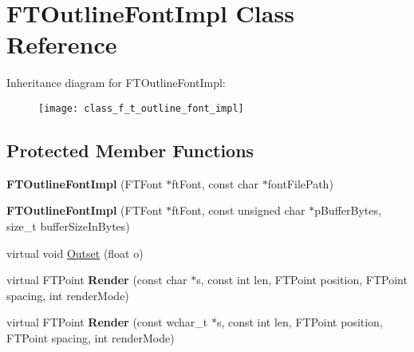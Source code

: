 \hypertarget{class_f_t_outline_font_impl}{}\section{F\+T\+Outline\+Font\+Impl Class Reference}
\label{class_f_t_outline_font_impl}
Inheritance diagram for F\+T\+Outline\+Font\+Impl\+:\begin{figure}[H]
\begin{center}
\leavevmode
\texttt{[image: class\_f\_t\_outline\_font\_impl]}
\end{center}
\end{figure}
\subsection*{Protected Member Functions}
\begin{DoxyCompactItemize}
\item 
{\bfseries F\+T\+Outline\+Font\+Impl} (F\+T\+Font $\ast$ft\+Font, const char $\ast$font\+File\+Path)\hypertarget{class_f_t_outline_font_impl_a01af1e37c082fce3f483361b455f9ac2}{}\label{class_f_t_outline_font_impl_a01af1e37c082fce3f483361b455f9ac2}

\item 
{\bfseries F\+T\+Outline\+Font\+Impl} (F\+T\+Font $\ast$ft\+Font, const unsigned char $\ast$p\+Buffer\+Bytes, size\+\_\+t buffer\+Size\+In\+Bytes)\hypertarget{class_f_t_outline_font_impl_a3b0befb0c886bbc7cb8873afbfc0a9db}{}\label{class_f_t_outline_font_impl_a3b0befb0c886bbc7cb8873afbfc0a9db}

\item 
virtual void \hyperlink{class_f_t_outline_font_impl_a22cb75a9c717403f399906d24d4aac82}{Outset} (float o)
\item 
virtual F\+T\+Point {\bfseries Render} (const char $\ast$s, const int len, F\+T\+Point position, F\+T\+Point spacing, int render\+Mode)\hypertarget{class_f_t_outline_font_impl_a10caae0ba62ba4c7d5a8742114517651}{}\label{class_f_t_outline_font_impl_a10caae0ba62ba4c7d5a8742114517651}

\item 
virtual F\+T\+Point {\bfseries Render} (const wchar\+\_\+t $\ast$s, const int len, F\+T\+Point position, F\+T\+Point spacing, int render\+Mode)\hypertarget{class_f_t_outline_font_impl_aa4957e338292c7202df9bfb1362e4084}{}\label{class_f_t_outline_font_impl_aa4957e338292c7202df9bfb1362e4084}

\end{DoxyCompactItemize}

